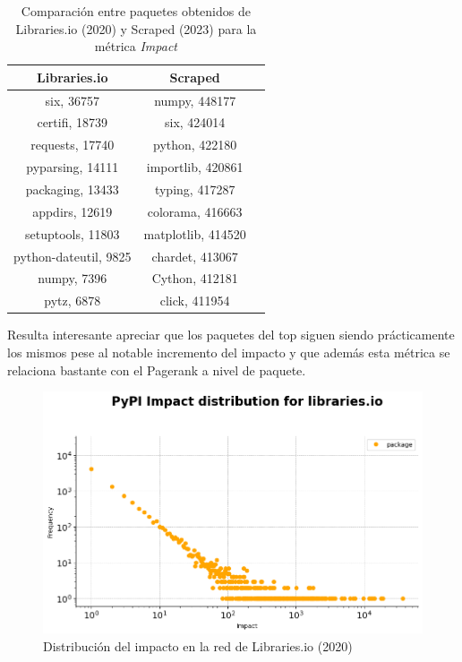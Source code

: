 \begin{table}[ht!]
    \centering
    \caption{Comparación entre paquetes obtenidos de Libraries.io (2020) y Scraped (2023) para la métrica \textit{Impact}}
    \begin{tabular}{|c|c|c|}
        \hline
        \textbf{Libraries.io} & \textbf{Scraped}   \\
        \hline
        six, 36757            & numpy, 448177      \\
        certifi, 18739        & six, 424014        \\
        requests, 17740       & python, 422180     \\
        pyparsing, 14111      & importlib, 420861  \\
        packaging, 13433      & typing, 417287     \\
        appdirs, 12619        & colorama, 416663   \\
        setuptools, 11803     & matplotlib, 414520 \\
        python-dateutil, 9825 & chardet, 413067    \\
        numpy, 7396           & Cython, 412181     \\
        pytz, 6878            & click, 411954      \\
        \hline
    \end{tabular}
    \label{tab:Comparación entre paquetes obtenidos de Libraries.io (2020) y Scraped (2023) para la métrica Impact}
\end{table}


Resulta interesante apreciar que los paquetes del top siguen siendo prácticamente los mismos
pese al notable incremento del impacto y que además esta métrica se relaciona bastante con el
Pagerank a nivel de paquete.

\begin{figure}[ht!]
    \begin{center}
        \includegraphics[width=1\textwidth]{img/pypi/librariesio_impact_distribution.png}
        \caption{Distribución del impacto en la red de Libraries.io (2020)}
        \label{fig:Distribución del impacto en la red de Libraries.io}
    \end{center}
\end{figure}

